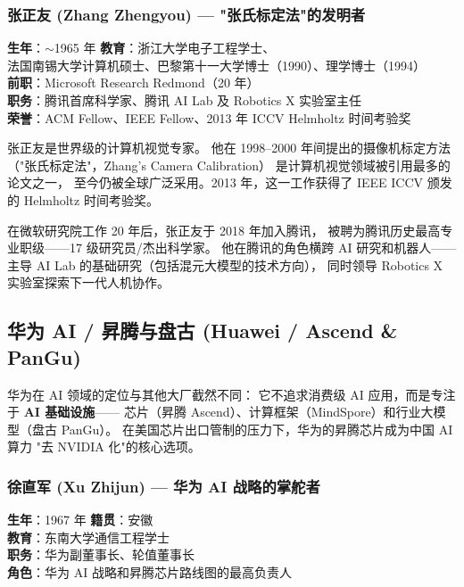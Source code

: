 \subsubsection{张正友 (Zhang Zhengyou) — "张氏标定法"的发明者}

\begin{keybox}
\textbf{生年}：$\sim$1965 年 \quad \textbf{教育}：浙江大学电子工程学士、\\
\quad 法国南锡大学计算机硕士、巴黎第十一大学博士（1990）、理学博士（1994） \\
\textbf{前职}：Microsoft Research Redmond（20 年） \\
\textbf{职务}：腾讯首席科学家、腾讯 AI Lab 及 Robotics X 实验室主任 \\
\textbf{荣誉}：ACM Fellow、IEEE Fellow、2013 年 ICCV Helmholtz 时间考验奖
\end{keybox}

张正友是世界级的计算机视觉专家。
他在 1998--2000 年间提出的摄像机标定方法
（"张氏标定法"，Zhang's Camera Calibration）
是计算机视觉领域被引用最多的论文之一，
至今仍被全球广泛采用。2013 年，这一工作获得了
IEEE ICCV 颁发的 Helmholtz 时间考验奖。

在微软研究院工作 20 年后，张正友于 2018 年加入腾讯，
被聘为腾讯历史最高专业职级——17 级研究员/杰出科学家。
他在腾讯的角色横跨 AI 研究和机器人——
主导 AI Lab 的基础研究（包括混元大模型的技术方向），
同时领导 Robotics X 实验室探索下一代人机协作。


\subsection{华为 AI / 昇腾与盘古 (Huawei / Ascend \& PanGu)}

华为在 AI 领域的定位与其他大厂截然不同：
它不追求消费级 AI 应用，而是专注于 \textbf{AI 基础设施}——
芯片（昇腾 Ascend）、计算框架（MindSpore）和行业大模型（盘古 PanGu）。
在美国芯片出口管制的压力下，华为的昇腾芯片成为中国 AI 算力
"去 NVIDIA 化"的核心选项。

\subsubsection{徐直军 (Xu Zhijun) — 华为 AI 战略的掌舵者}

\begin{keybox}
\textbf{生年}：1967 年 \quad \textbf{籍贯}：安徽 \\
\textbf{教育}：东南大学通信工程学士 \\
\textbf{职务}：华为副董事长、轮值董事长 \\
\textbf{角色}：华为 AI 战略和昇腾芯片路线图的最高负责人
\end{keybox}

